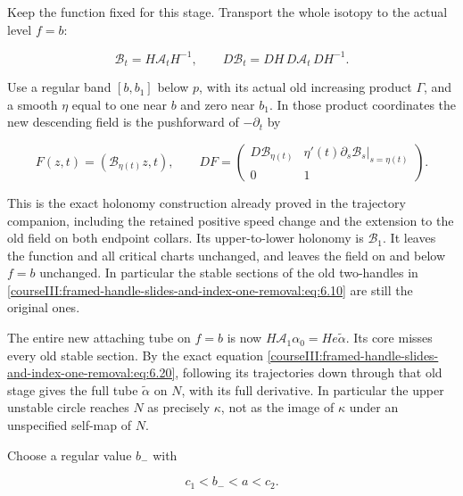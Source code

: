 Keep the function fixed for this stage. Transport the whole isotopy to the actual level \(f=b\):

\begin{equation}
\mathcal B_t=H\mathcal A_tH^{-1},\qquad
 D\mathcal B_t=DH\,D\mathcal A_t\,DH^{-1}.
 \label{courseIII:framed-handle-slides-and-index-one-removal:eq:7.6}
\end{equation}

Use a regular band \([b,b_1]\) below \(p\), with its actual old increasing product \(\Gamma\), and a smooth \(\eta\) equal to one near \(b\) and zero near \(b_1\). In those product coordinates the new descending field is the pushforward of \(-\partial_t\) by

\begin{equation}
F(z,t)=(\mathcal B_{\eta(t)}z,t),\qquad
 DF=
 \begin{pmatrix}
 D\mathcal B_{\eta(t)}&
       \eta'(t)\partial_s\mathcal B_s|_{s=\eta(t)}\\
 0&1
 \end{pmatrix}.
 \label{courseIII:framed-handle-slides-and-index-one-removal:eq:7.7}
\end{equation}

This is the exact holonomy construction already proved in the trajectory companion, including the retained positive speed change and the extension to the old field on both endpoint collars. Its upper-to-lower holonomy is \(\mathcal B_1\). It leaves the function and all critical charts unchanged, and leaves the field on and below \(f=b\) unchanged. In particular the stable sections of the old two-handles in \eqref{courseIII:framed-handle-slides-and-index-one-removal:eq:6.10} are still the original ones.

The entire new attaching tube on \(f=b\) is now
\(H\mathcal A_1\alpha_0=He\widetilde\alpha\).
Its core misses every old stable section. By the exact equation \eqref{courseIII:framed-handle-slides-and-index-one-removal:eq:6.20}, following its trajectories down through that old stage gives the full tube \(\widetilde\alpha\) on \(N\), with its full derivative. In particular the upper unstable circle reaches \(N\) as precisely \(\kappa\), not as the image of \(\kappa\) under an unspecified self-map of \(N\).

Choose a regular value \(b_-\) with

\begin{equation}
c_1<b_-<a<c_2.
 \label{courseIII:framed-handle-slides-and-index-one-removal:eq:7.8}
\end{equation}

